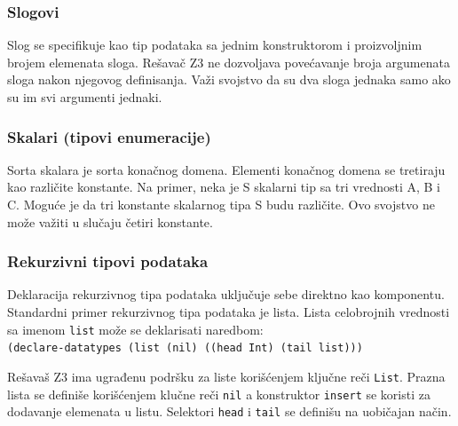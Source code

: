 \documentclass[12pt,oneside]{memoir}
\begin{document}
\subsubsection{Slogovi}
Slog se specifikuje kao tip podataka sa jednim konstruktorom i proizvoljnim brojem elemenata sloga. Rešavač Z3 ne dozvoljava povećavanje broja argumenata sloga nakon njegovog definisanja. Važi svojstvo da su dva sloga jednaka samo ako su im svi argumenti jednaki.
\subsubsection{Skalari (tipovi enumeracije)}

Sorta skalara je sorta konačnog domena. Elementi konačnog domena se tretiraju kao različite konstante. Na primer, neka je S skalarni tip sa tri vrednosti A, B i C. Moguće je da tri konstante skalarnog tipa S budu različite. Ovo svojstvo ne može važiti u slučaju četiri konstante.


\subsubsection{Rekurzivni tipovi podataka}

Deklaracija rekurzivnog tipa podataka uključuje sebe direktno kao komponentu. Standardni primer rekurzivnog tipa podataka je lista. 
Lista celobrojnih vrednosti sa imenom \texttt{list} može se deklarisati naredbom:\\
\texttt{(declare-datatypes (list (nil) ((head Int) (tail list)))}
\par
Rešavaš Z3 ima ugrađenu podršku za liste korišćenjem ključne reči \texttt{List}.
Prazna lista se definiše korišćenjem klučne reči \texttt{nil} a konstruktor \texttt{insert} se koristi za dodavanje elemenata u listu. Selektori \texttt{head} i \texttt{tail} se definišu na uobičajan način.
\end{document}
